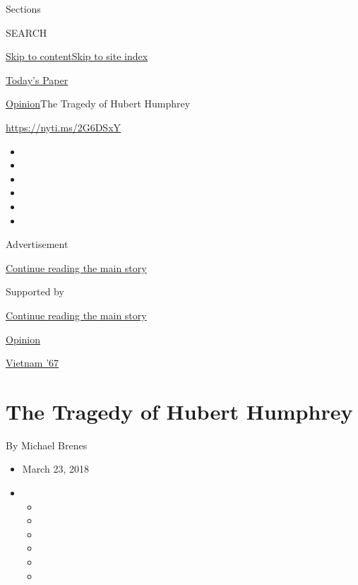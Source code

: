 Sections

SEARCH

\protect\hyperlink{site-content}{Skip to
content}\protect\hyperlink{site-index}{Skip to site index}

\href{https://myaccount.nytimes3xbfgragh.onion/auth/login?response_type=cookie\&client_id=vi}{}

\href{https://www.nytimes3xbfgragh.onion/section/todayspaper}{Today's
Paper}

\href{/section/opinion}{Opinion}\textbar{}The Tragedy of Hubert Humphrey

\url{https://nyti.ms/2G6DSxY}

\begin{itemize}
\item
\item
\item
\item
\item
\item
\end{itemize}

Advertisement

\protect\hyperlink{after-top}{Continue reading the main story}

Supported by

\protect\hyperlink{after-sponsor}{Continue reading the main story}

\href{/section/opinion}{Opinion}

\href{/column/vietnam-67}{Vietnam '67}

\hypertarget{the-tragedy-of-hubert-humphrey}{%
\section{The Tragedy of Hubert
Humphrey}\label{the-tragedy-of-hubert-humphrey}}

By Michael Brenes

\begin{itemize}
\item
  March 23, 2018
\item
  \begin{itemize}
  \item
  \item
  \item
  \item
  \item
  \item
  \end{itemize}
\end{itemize}

